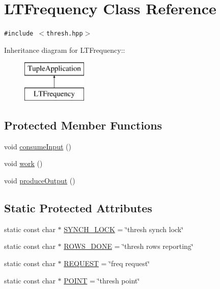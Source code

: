 \hypertarget{class_l_t_frequency}{
\section{LTFrequency Class Reference}
\label{class_l_t_frequency}
}
{\tt \#include $<$thresh.hpp$>$}

Inheritance diagram for LTFrequency::\begin{figure}[H]
\begin{center}
\leavevmode
\includegraphics[height=2cm]{class_l_t_frequency}
\end{center}
\end{figure}
\subsection*{Protected Member Functions}
\begin{CompactItemize}
\item 
void \hyperlink{class_l_t_frequency_4ac4fa1a348246caf0d34506fcd09a64}{consumeInput} ()
\item 
void \hyperlink{class_l_t_frequency_7c47cf36b228505f79225a3fe8a00f01}{work} ()
\item 
void \hyperlink{class_l_t_frequency_e80cd869c8935cb7fe553c6ad27e861b}{produceOutput} ()
\end{CompactItemize}
\subsection*{Static Protected Attributes}
\begin{CompactItemize}
\item 
static const char $\ast$ \hyperlink{class_l_t_frequency_805150bf6fcc824bac1fcbb14914ecd4}{SYNCH\_\-LOCK} = \char`\"{}thresh synch lock\char`\"{}
\item 
static const char $\ast$ \hyperlink{class_l_t_frequency_db43dba3f48655d75150da76ff2a6a88}{ROWS\_\-DONE} = \char`\"{}thresh rows reporting\char`\"{}
\item 
static const char $\ast$ \hyperlink{class_l_t_frequency_f2db2bc6c1837dff0fa90a88a2290d62}{REQUEST} = \char`\"{}freq request\char`\"{}
\item 
static const char $\ast$ \hyperlink{class_l_t_frequency_731ba0c5b44e4ffa55496bceb2bd6578}{POINT} = \char`\"{}thresh point\char`\"{}
\end{CompactItemize}


